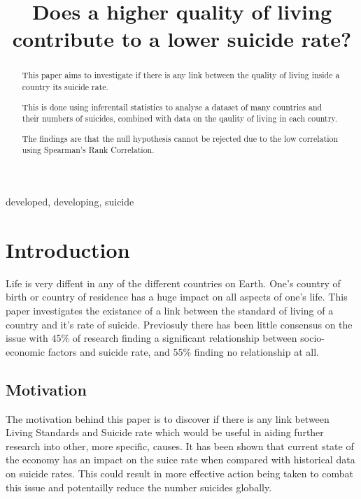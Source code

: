 \documentclass[conference]{IEEEtran}
\begin{document}
\title{Does a higher quality of living contribute to a lower suicide rate?\\
}

\author{
}

\maketitle

\begin{abstract}
This paper aims to investigate if there is any link between the quality of living inside a country its suicide rate.

This is done using inferentail statistics to analyse a dataset of many countries and their numbers of suicides, combined with data on the qaulity of living in each country.

The findings are that the null hypothesis cannot be rejected due to the low correlation using Spearman's Rank Correlation.
\end{abstract}

\begin{IEEEkeywords}
developed, developing, suicide
\end{IEEEkeywords}

\section{Introduction}
Life is very diffent in any of the different countries on Earth. One's country of birth or country of residence
has a huge impact on all aspects of one's life. This paper investigates the existance of a link between
the standard of living of a country and it's rate of suicide. Previosuly there has been little consensus on the issue
with 45\% of research finding a significant relationship between socio-economic factors and suicide rate, and 55\%
finding no relationship at all\cite{sui_systematic_review}.

\subsection{Motivation}
The motivation behind this paper is to discover if there is any link between Living Standards and Suicide rate which would be useful in aiding further
research into other, more specific, causes. It has been shown that current state of the economy
has an impact on the suice rate when compared with historical data on suicide rates\cite{Suicides_2008-10}. This could result in more effective action being taken to combat this
issue and potentailly reduce the number suicides globally.
\end{document}
